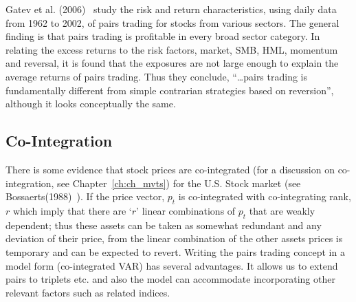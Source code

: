 \begin{center}
\noindent{} 
\end{center} \twomedskip


Gatev et al. (2006)~\cite{ggr} study the risk and return characteristics, using daily data from 1962 to 2002, of pairs trading for stocks from various sectors. The general finding is that pairs trading is profitable in every broad sector category. In relating the excess returns to the risk factors, market, SMB, HML, momentum and reversal, it is found that the exposures are not large enough to explain the average returns of pairs trading. Thus they conclude, ``\dots pairs trading is fundamentally different from simple contrarian strategies based on reversion'', although it looks conceptually the same. 


\subsection{Co-Integration\label{subsec:co_integ}} \label{in:coint3}

There is some evidence that stock prices are co-integrated (for a discussion on co-integration, see Chapter~\ref{ch:ch_mvts}) for the U.S. Stock market (see Bossaerts(1988)~\cite{bossaerts1988common}). If the price vector, $p_t$ is co-integrated with co-integrating rank, $r$ which imply that there are `$r$' linear combinations of $p_t$ that are weakly dependent; thus these assets can be taken as somewhat redundant and any deviation of their price, from the linear combination of the other assets prices is temporary and can be expected to revert. Writing the pairs trading concept in a model form (co-integrated VAR) has several advantages. It allows us to extend pairs to triplets etc. and also the model can accommodate incorporating other relevant factors such as related indices.


